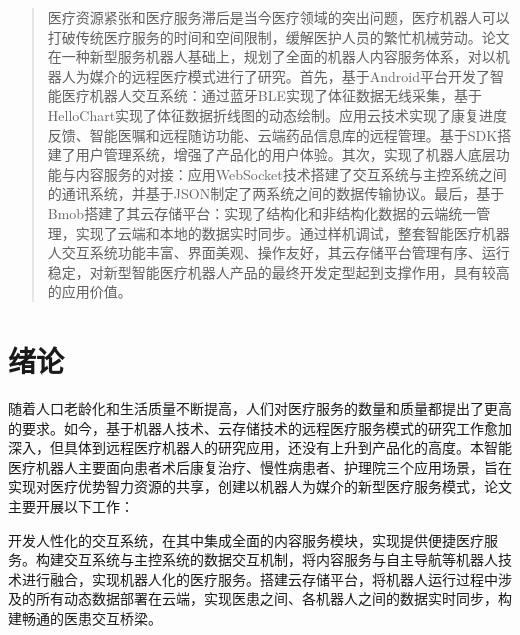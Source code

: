 \documentclass[UTF8]{XJTUthesis}
\begin{document}

\tableofcontents
\clearpage

\begin{abstract}
医疗资源紧张和医疗服务滞后是当今医疗领域的突出问题，医疗机器人可以打破传统医疗服务的时间和空间限制，缓解医护人员的繁忙机械劳动。论文在一种新型服务机器人基础上，规划了全面的机器人内容服务体系，对以机器人为媒介的远程医疗模式进行了研究。首先，基于Android平台开发了智能医疗机器人交互系统：通过蓝牙BLE实现了体征数据无线采集，基于HelloChart实现了体征数据折线图的动态绘制。应用云技术实现了康复进度反馈、智能医嘱和远程随访功能、云端药品信息库的远程管理。基于SDK搭建了用户管理系统，增强了产品化的用户体验。其次，实现了机器人底层功能与内容服务的对接：应用WebSocket技术搭建了交互系统与主控系统之间的通讯系统，并基于JSON制定了两系统之间的数据传输协议。最后，基于Bmob搭建了其云存储平台：实现了结构化和非结构化数据的云端统一管理，实现了云端和本地的数据实时同步。通过样机调试，整套智能医疗机器人交互系统功能丰富、界面美观、操作友好，其云存储平台管理有序、运行稳定，对新型智能医疗机器人产品的最终开发定型起到支撑作用，具有较高的应用价值。
\end{abstract}

\section{绪论}
随着人口老龄化和生活质量不断提高，人们对医疗服务的数量和质量都提出了更高的要求。如今，基于机器人技术、云存储技术的远程医疗服务模式的研究工作愈加深入，但具体到远程医疗机器人的研究应用，还没有上升到产品化的高度。本智能医疗机器人主要面向患者术后康复治疗、慢性病患者、护理院三个应用场景，旨在实现对医疗优势智力资源的共享，创建以机器人为媒介的新型医疗服务模式，论文主要开展以下工作：\par
开发人性化的交互系统，在其中集成全面的内容服务模块，实现提供便捷医疗服务。构建交互系统与主控系统的数据交互机制，将内容服务与自主导航等机器人技术进行融合，实现机器人化的医疗服务。搭建云存储平台，将机器人运行过程中涉及的所有动态数据部署在云端，实现医患之间、各机器人之间的数据实时同步，构建畅通的医患交互桥梁。\par
\end{document}

